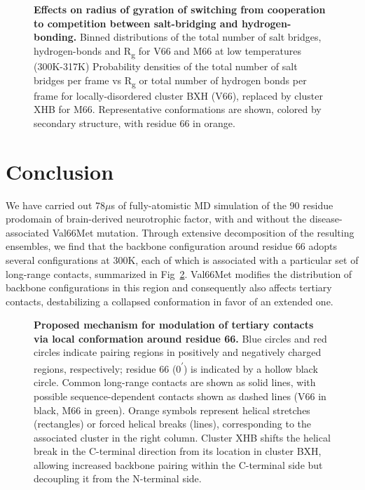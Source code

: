 \documentclass[10pt,letterpaper]{article}
\begin{document}
\begin{figure}[!ht]
\caption{{\bf Effects on radius of gyration of switching from cooperation to competition between salt-bridging and hydrogen-bonding.} Binned distributions of the total number of salt bridges, hydrogen-bonds and R\textsubscript{g} for V66 and M66 at low temperatures (300K-317K) 
Probability densities of the total number of salt bridges per frame vs R\textsubscript{g} or total number of hydrogen bonds per frame for locally-disordered cluster BXH (V66), replaced by cluster XHB for M66. Representative conformations are shown, colored by secondary structure, with residue 66 in orange.}
\label{fig7} 
\end{figure}

\section*{Conclusion}

We have carried out 78$\mu$s of fully-atomistic MD simulation of the 90 residue prodomain of brain-derived neurotrophic factor, with and without the disease-associated Val66Met mutation. Through extensive decomposition of the resulting ensembles, we find that the backbone configuration around residue 66 adopts several configurations at 300K, each of which is associated with a particular set of long-range contacts, summarized in Fig~\ref{fig8}. Val66Met modifies the distribution of backbone configurations in this region and consequently also affects tertiary contacts, destabilizing a collapsed conformation in favor of an extended one.  

\begin{figure}[!ht]
\caption{{\bf Proposed mechanism for modulation of tertiary contacts via local conformation around residue 66.}
Blue circles and red circles indicate pairing regions in positively and negatively charged regions, respectively; residue 66 (0\textsuperscript{$\prime$}) is indicated by a hollow black circle.  Common long-range contacts are shown as solid lines, with possible sequence-dependent contacts shown as dashed lines (V66 in black, M66 in green).   Orange symbols represent helical stretches (rectangles) or forced helical breaks (lines), corresponding to the associated cluster in the right column.  Cluster XHB shifts the helical break in the C-terminal direction from its location in cluster BXH, allowing increased backbone pairing within the C-terminal side but decoupling it from the N-terminal side.  }
\label{fig8} 
\end{figure}
\end{document}
